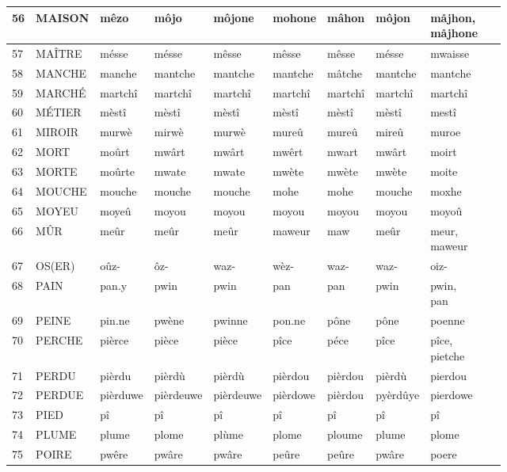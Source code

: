 \documentclass[french]{article}
\begin{document}
\begin{landscape}
\begin{longtable}{|l|l|l|l|l|l|l|l||l|l|}
	56 & MAISON & mêzo & môjo & môjone & mohone & mâhon & môjon & \makecell[l]{måjhon,\\måjhone} & ~ \\ \hline
	57 & MAÎTRE & mésse & mésse & mêsse & mêsse & mêsse & mésse & mwaisse & ~ \\ \hline
	58 & MANCHE & manche & mantche & mantche & mantche & mâtche & mantche & mantche & ~ \\ \hline
	59 & MARCHÉ & martchî & martchî & martchî & martchî & martchî & martchî & martchî & ~ \\ \hline
	60 & MÉTIER & mèstî & mèstî & mèstî & mèstî & mèstî & mèstî & mestî & ~ \\ \hline
	61 & MIROIR & murwè & mirwè & murwè & mureû & mureû & mireû & muroe & ~ \\ \hline
	62 & MORT & moûrt & mwârt & mwârt & mwêrt & mwart & mwârt & moirt & ~ \\ \hline
	63 & MORTE & moûrte & mwate & mwate & mwète & mwète & mwète & moite & ~ \\ \hline
	64 & MOUCHE & mouche & mouche & mouche & mohe & mohe & mouche & moxhe & ~ \\ \hline
	65 & MOYEU & moyeû & moyou & moyou & moyou & moyou & moyou & moyoû & ~ \\ \hline
	66 & MÛR & meûr & meûr & meûr & maweur & maw & meûr & \makecell[l]{meur,\\maweur} & ~ \\ \hline
	67 & OS(ER) & oûz- & ôz- & waz- & wèz- & waz- & waz- & oiz- & ~ \\ \hline
	68 & PAIN & pan.y & pwin & pwin & pan & pan & pwin & \makecell[l]{pwin,\\pan} & ~ \\ \hline
	69 & PEINE & pin.ne & pwène & pwinne & pon.ne & pône & pône & poenne & ~ \\ \hline
	70 & PERCHE & pièrce & pièce & pièce & pîce & péce & pîce & \makecell[l]{pîce,\\pietche} & ~ \\ \hline
	71 & PERDU & pièrdu & pièrdù & pièrdù & pièrdou & pièrdou & pièrdù & pierdou & ~ \\ \hline
	72 & PERDUE & pièrduwe & pièrdeuwe & pièrdeuwe & pièrdowe & pièrdou & pyèrdûye & pierdowe & ~ \\ \hline
	73 & PIED & pî & pî & pî & pî & pî & pî & pî & ~ \\ \hline
	74 & PLUME & plume & plome & plùme & plome & ploume & plume & plome & ~ \\ \hline
	75 & POIRE & pwêre & pwâre & pwâre & peûre & peûre & pwâre & poere & ~ \\ \hline

\end{longtable}
\end{landscape}
\end{document}

